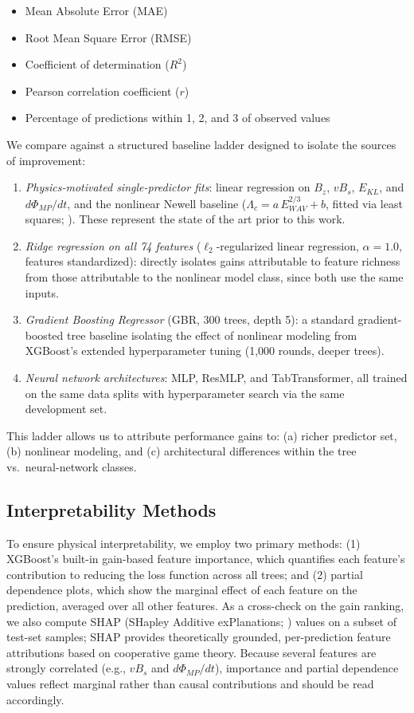 \documentclass[draft]{agujournal2019}
\let\citealt\citeNP
\begin{document}
\begin{itemize}
\item Mean Absolute Error (MAE)
\item Root Mean Square Error (RMSE)
\item Coefficient of determination ($R^2$)
\item Pearson correlation coefficient ($r$)
\item Percentage of predictions within 1\textdegree, 2\textdegree, and 3\textdegree{} of observed values
\end{itemize}

We compare against a structured baseline ladder designed to isolate the sources of improvement:
\begin{enumerate}
\item \textit{Physics-motivated single-predictor fits}: linear regression on $B_z$, $vB_s$, $E_{KL}$, and $d\Phi_{MP}/dt$, and the nonlinear Newell baseline ($\Lambda_c = a \, E_{WAV}^{2/3} + b$, fitted via least squares; \citealt{newell2006cusp}). These represent the state of the art prior to this work.
\item \textit{Ridge regression on all 74 features} ($\ell_2$-regularized linear regression, $\alpha = 1.0$, features standardized): directly isolates gains attributable to feature richness from those attributable to the nonlinear model class, since both use the same inputs.
\item \textit{Gradient Boosting Regressor} (GBR, 300 trees, depth 5): a standard gradient-boosted tree baseline isolating the effect of nonlinear modeling from XGBoost's extended hyperparameter tuning (1,000 rounds, deeper trees).
\item \textit{Neural network architectures}: MLP, ResMLP, and TabTransformer, all trained on the same data splits with hyperparameter search via the same development set.
\end{enumerate}
This ladder allows us to attribute performance gains to: (a) richer predictor set, (b) nonlinear modeling, and (c) architectural differences within the tree vs.\ neural-network classes.

\subsection{Interpretability Methods}

To ensure physical interpretability, we employ two primary methods: (1) XGBoost's built-in gain-based feature importance, which quantifies each feature's contribution to reducing the loss function across all trees; and (2) partial dependence plots, which show the marginal effect of each feature on the prediction, averaged over all other features. As a cross-check on the gain ranking, we also compute SHAP (SHapley Additive exPlanations; \citealt{lundberg2017shap}) values on a subset of test-set samples; SHAP provides theoretically grounded, per-prediction feature attributions based on cooperative game theory. Because several features are strongly correlated (e.g., $vB_s$ and $d\Phi_{MP}/dt$), importance and partial dependence values reflect marginal rather than causal contributions and should be read accordingly.
\end{document}
